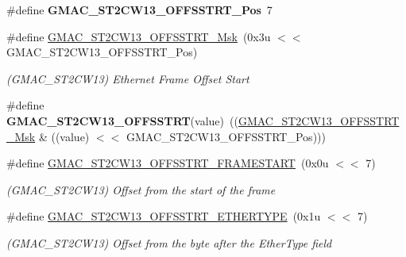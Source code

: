 \begin{DoxyCompactItemize}
\item 
\mbox{\label{group__SAMV71__GMAC_ga2010958fc1529990f17060d4eeec249c}} 
\#define {\bfseries G\+M\+A\+C\+\_\+\+S\+T2\+C\+W13\+\_\+\+O\+F\+F\+S\+S\+T\+R\+T\+\_\+\+Pos}~7
\item 
\mbox{\label{group__SAMV71__GMAC_ga37bf8aabb14767ec46e707b2f523620c}} 
\#define \mbox{\hyperlink{group__SAMV71__GMAC_ga37bf8aabb14767ec46e707b2f523620c}{G\+M\+A\+C\+\_\+\+S\+T2\+C\+W13\+\_\+\+O\+F\+F\+S\+S\+T\+R\+T\+\_\+\+Msk}}~(0x3u $<$$<$ G\+M\+A\+C\+\_\+\+S\+T2\+C\+W13\+\_\+\+O\+F\+F\+S\+S\+T\+R\+T\+\_\+\+Pos)
\begin{DoxyCompactList}\small\item\em (G\+M\+A\+C\+\_\+\+S\+T2\+C\+W13) Ethernet Frame Offset Start \end{DoxyCompactList}\item 
\mbox{\label{group__SAMV71__GMAC_ga842e91c198670693ebf6af0210312e64}} 
\#define {\bfseries G\+M\+A\+C\+\_\+\+S\+T2\+C\+W13\+\_\+\+O\+F\+F\+S\+S\+T\+RT}(value)~((\mbox{\hyperlink{group__SAMV71__GMAC_ga37bf8aabb14767ec46e707b2f523620c}{G\+M\+A\+C\+\_\+\+S\+T2\+C\+W13\+\_\+\+O\+F\+F\+S\+S\+T\+R\+T\+\_\+\+Msk}} \& ((value) $<$$<$ G\+M\+A\+C\+\_\+\+S\+T2\+C\+W13\+\_\+\+O\+F\+F\+S\+S\+T\+R\+T\+\_\+\+Pos)))
\item 
\mbox{\label{group__SAMV71__GMAC_gafc44a7401067be036541c4e7549fdf05}} 
\#define \mbox{\hyperlink{group__SAMV71__GMAC_gafc44a7401067be036541c4e7549fdf05}{G\+M\+A\+C\+\_\+\+S\+T2\+C\+W13\+\_\+\+O\+F\+F\+S\+S\+T\+R\+T\+\_\+\+F\+R\+A\+M\+E\+S\+T\+A\+RT}}~(0x0u $<$$<$ 7)
\begin{DoxyCompactList}\small\item\em (G\+M\+A\+C\+\_\+\+S\+T2\+C\+W13) Offset from the start of the frame \end{DoxyCompactList}\item 
\mbox{\label{group__SAMV71__GMAC_gab6ee73298820965f3331f47aa7432cab}} 
\#define \mbox{\hyperlink{group__SAMV71__GMAC_gab6ee73298820965f3331f47aa7432cab}{G\+M\+A\+C\+\_\+\+S\+T2\+C\+W13\+\_\+\+O\+F\+F\+S\+S\+T\+R\+T\+\_\+\+E\+T\+H\+E\+R\+T\+Y\+PE}}~(0x1u $<$$<$ 7)
\begin{DoxyCompactList}\small\item\em (G\+M\+A\+C\+\_\+\+S\+T2\+C\+W13) Offset from the byte after the Ether\+Type field \end{DoxyCompactList}\item 

\end{DoxyCompactItemize}
